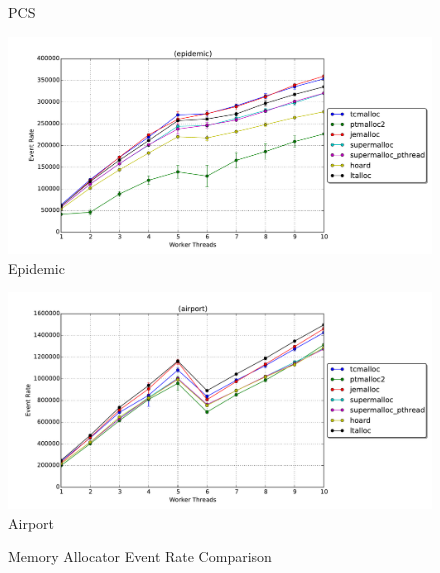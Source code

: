 \documentclass[11pt]{book}
\begin{document}
\begin{figure}
\begin{minipage}{.5\textwidth}
\begin{center}
      PCS \\
    \end{center}
  \end{minipage}
  \begin{minipage}{.5\textwidth}
    \begin{center}
      \includegraphics[width=\textwidth,keepaspectratio,quiet]{figs/memory_allocation/epidemic_eventrate.pdf} \\
      Epidemic \\
    \end{center}
  \end{minipage}%
  \begin{minipage}{.5\textwidth}
    \begin{center}
      \includegraphics[width=\textwidth,keepaspectratio,quiet]{figs/memory_allocation/airport_eventrate.pdf} \\
      Airport \\
    \end{center}
  \end{minipage}
  \caption{Memory Allocator Event Rate Comparison}\label{allocator_analysis_eventrate}
\end{figure}
\end{document}
